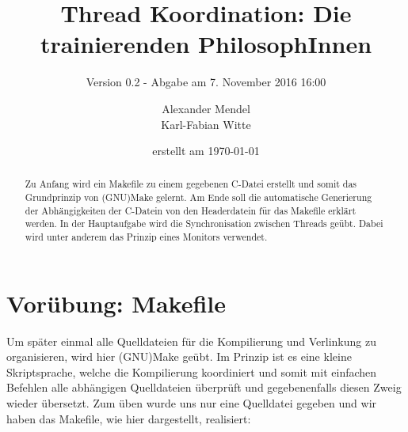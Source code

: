 \documentclass[
   draft=false
  ,paper=a4
  ,twoside=false
  ,fontsize=11pt
  ,headsepline
  ,BCOR10mm
  ,DIV11
  ,parskip=full+
]{scrartcl} %
\begin{document}
\titlehead{Betriebsysteme WS 2016 Praktikum 02}%
\subject{BS Praktikumsaufgabe 02}
\title{Thread Koordination: Die trainierenden PhilosophInnen}
\subtitle{Version 0.2 - Abgabe am 7. November 2016 16:00}
\author{Alexander Mendel \\ Karl-Fabian Witte}
\date{erstellt am \today}%
\maketitle%
\begin{abstract}
  Zu Anfang wird ein Makefile zu einem gegebenen C-Datei
  erstellt und somit das Grundprinzip von (GNU)Make gelernt.
  Am Ende soll die automatische Generierung der Abhängigkeiten der C-Datein
  von den Headerdatein für das Makefile erklärt werden. In der Hauptaufgabe
  wird die Synchronisation zwischen Threads geübt.
  Dabei wird unter anderem das Prinzip eines Monitors verwendet.
\end{abstract}
\tableofcontents
\flushleft
\section{Vorübung: Makefile}
Um später einmal alle Quelldateien für die Kompilierung und Verlinkung zu
organisieren, wird hier (GNU)Make geübt. Im Prinzip ist es eine kleine
Skriptsprache, welche die Kompilierung koordiniert und somit mit einfachen
Befehlen alle abhängigen Quelldateien überprüft und gegebenenfalls diesen
Zweig wieder übersetzt.
Zum üben wurde uns nur eine Quelldatei gegeben und wir haben das Makefile,
wie hier dargestellt, realisiert:
\end{document}
